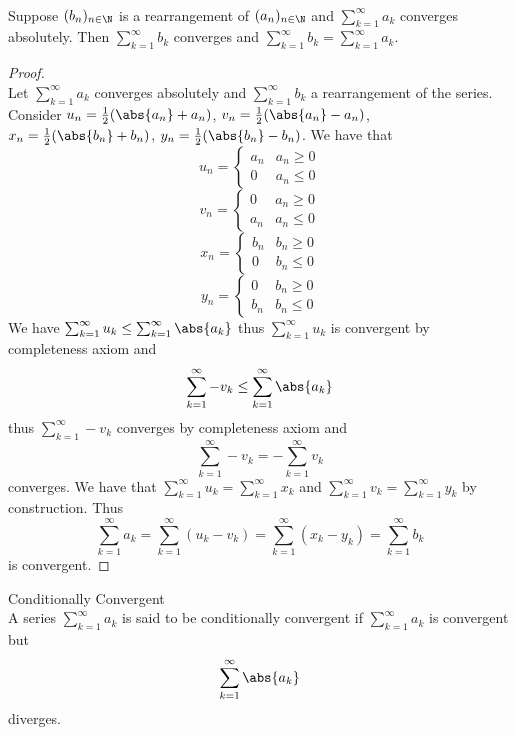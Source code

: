 \documentclass[a4paper]{article}
\begin{document}
\begin{prp}{}{}\\ Suppose $(b_n)_{n\in\N}$ is a rearrangement of $(a_n)_{n\in\N}$ and $\sum_{k=1}^{\infty}a_k$ converges absolutely. Then $\sum_{k=1}^{\infty}b_k$ converges and $\sum_{k=1}^{\infty}b_k=\sum_{k=1}^{\infty}a_k$. 
\begin{proof}\\
Let $\sum_{k=1}^{\infty}a_k$ converges absolutely and $\sum_{k=1}^{\infty}b_k$ a rearrangement of the series. Consider $u_n=\frac{1}{2}(\abs{a_n}+a_n)$, $v_n=\frac{1}{2}(\abs{a_n}-a_n)$, $x_n=\frac{1}{2}(\abs{b_n}+b_n)$, $y_n=\frac{1}{2}(\abs{b_n}-b_n)$. We have that $$u_n=\begin{cases}
a_n & a_n\geq0\\
0 & a_n\leq 0
\end{cases}$$ $$v_n=\begin{cases}
0 & a_n\geq0\\
a_n & a_n\leq 0
\end{cases}$$ $$x_n=\begin{cases}
b_n & b_n\geq0\\
0 & b_n\leq 0
\end{cases}$$ $$y_n=\begin{cases}
0 & b_n\geq0\\
b_n & b_n\leq 0
\end{cases}$$
We have $\sum_{k=1}^{\infty}u_k\leq\sum_{k=1}^{\infty}\abs{a_k}$ thus $\sum_{k=1}^{\infty}u_k$ is convergent by completeness axiom and $$\sum_{k=1}^{\infty}-v_k\leq\sum_{k=1}^{\infty}\abs{a_k}$$ thus $\sum_{k=1}^{\infty}-v_k$ converges by completeness axiom and $$\sum_{k=1}^{\infty}-v_k=-\sum_{k=1}^{\infty}v_k$$ converges. We have that $\sum_{k=1}^{\infty} u_k=\sum_{k=1}^{\infty} x_k$ and $\sum_{k=1}^{\infty} v_k=\sum_{k=1}^{\infty} y_k$ by construction. Thus $$\sum_{k=1}^{\infty} a_k=\sum_{k=1}^{\infty}(u_k-v_k)=\sum_{k=1}^{\infty}(x_k-y_k)=\sum_{k=1}^{\infty} b_k$$ is convergent. 
\end{proof}
\end{prp}

\begin{defn}{Conditionally Convergent}{}\\ A series $\sum_{k=1}^{\infty}a_k$ is said to be conditionally convergent if $\sum_{k=1}^{\infty}a_k$ is convergent but $$\sum_{k=1}^{\infty}\abs{a_k}$$ diverges. 
\end{defn}
\end{document}
